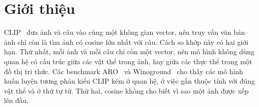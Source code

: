 \section{Giới thiệu}
\label{sec:intro}

CLIP~\cite{radford2021clip} đưa ảnh và câu vào cùng một không gian vector, nên truy vấn văn bản--ảnh chỉ còn là tìm ảnh
có cosine lớn nhất với câu. Cách so khớp này có hai giới hạn. Thứ nhất, mỗi ảnh và mỗi câu chỉ còn một vector, nên mô hình
không dùng quan hệ có cấu trúc giữa các vật thể trong ảnh, hay giữa các thực thể trong một đồ thị tri thức. Các benchmark
ARO~\cite{rw-yuksekgonul2023aro} và Winoground~\cite{rw-thrush2022winoground} cho thấy các mô hình huấn luyện tương phản
kiểu CLIP kém ở quan hệ, ở việc gắn thuộc tính với đúng vật thể và ở thứ tự từ. Thứ hai, cosine không cho biết vì sao một
ảnh được xếp lên đầu.

